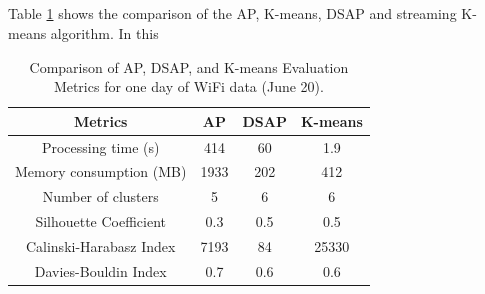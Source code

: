 \documentclass[../UNBThesis2.tex]{subfiles}
\begin{document}
\subsection{}


Table \ref{comp2} shows the comparison of the AP, K-means, DSAP and streaming K-means algorithm.
In this 


\begin{table}[h]
    \centering
    \caption{Comparison of AP, DSAP, and K-means Evaluation Metrics for one day of WiFi data (June 20).}
    \label{comp2}
    \begin{tabular}{|c|c|c|c|}
    \hline
      Metrics & AP & DSAP & K-means  \\
     \hline
      Processing time (s)         &   414     &      60      &       1.9     \\
     \hline
      Memory consumption (MB)     &   1933    &      202     &      412\\
     \hline
      Number of clusters          &   5       &     6        &        6  \\
      \hline
      Silhouette Coefficient      &   0.3     &      0.5     &      0.5 \\
    \hline
    Calinski-Harabasz Index       &      7193 &       84     &       25330     \\
    \hline
     Davies-Bouldin Index         &     0.7   &      0.6     &       0.6\\
    \hline
    \end{tabular}
\end{table}
\end{document}
